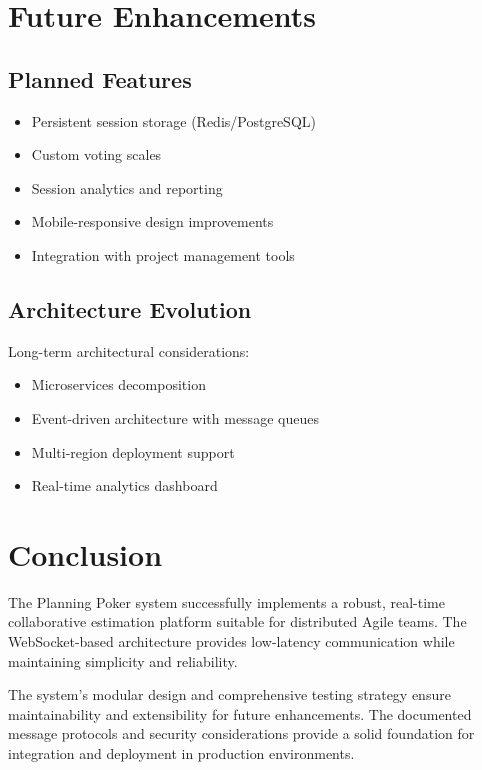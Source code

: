 \documentclass[11pt,a4paper]{article}
\begin{document}
\section{Future Enhancements}

\subsection{Planned Features}

\begin{itemize}
    \item Persistent session storage (Redis/PostgreSQL)
    \item Custom voting scales
    \item Session analytics and reporting
    \item Mobile-responsive design improvements
    \item Integration with project management tools
\end{itemize}

\subsection{Architecture Evolution}

Long-term architectural considerations:

\begin{itemize}
    \item Microservices decomposition
    \item Event-driven architecture with message queues
    \item Multi-region deployment support
    \item Real-time analytics dashboard
\end{itemize}

\section{Conclusion}

The Planning Poker system successfully implements a robust, real-time collaborative estimation platform suitable for distributed Agile teams. The WebSocket-based architecture provides low-latency communication while maintaining simplicity and reliability.

The system's modular design and comprehensive testing strategy ensure maintainability and extensibility for future enhancements. The documented message protocols and security considerations provide a solid foundation for integration and deployment in production environments.



\end{document}
